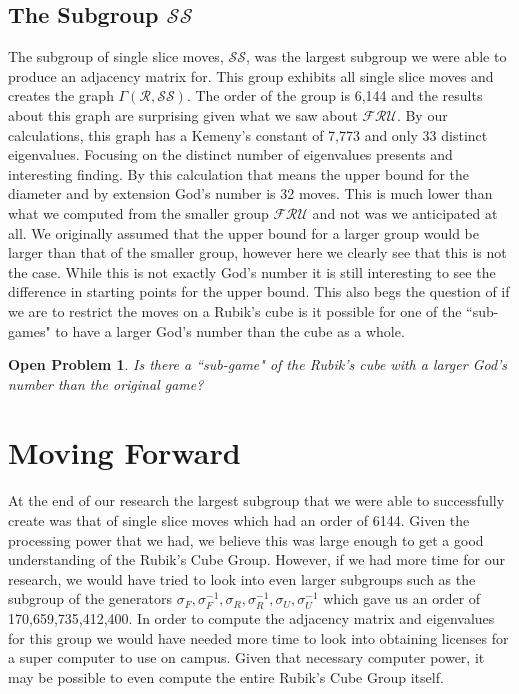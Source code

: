 \documentclass{article}
\newtheorem{open-problem}[theorem]{Open Problem}
\begin{document}
\subsection{The Subgroup $\mathcal{SS}$}
The subgroup of single slice moves, $\mathcal{SS}$, was the largest subgroup we were able to produce an adjacency matrix for.  This group exhibits all single slice moves and creates the graph $\Gamma(\mathcal{R}, \mathcal{SS})$.  The order of the group is 6,144 and the results about this graph are surprising given what we saw about $\mathcal{FRU}$.  By our calculations, this graph has a Kemeny's constant of 7,773 and only 33 distinct eigenvalues.  Focusing on the distinct number of eigenvalues presents and interesting finding.  By this calculation that means the upper bound for the diameter and by extension God's number is 32 moves.  This is much lower than what we computed from the smaller group $\mathcal{FRU}$ and not was we anticipated at all.  We originally assumed that the upper bound for a larger group would be larger than that of the smaller group, however here we clearly see that this is not the case.  While this is not exactly God's number it is still interesting to see the difference in starting points for the upper bound.  This also begs the question of if we are to restrict the moves on a Rubik's cube is it possible for one of the ``sub-games" to have a larger God's number than the cube as a whole. 
\begin{open-problem}
Is there a ``sub-game" of the Rubik's cube with a larger God's number than the original game?
\end{open-problem}


\section{Moving Forward}
At the end of our research the largest subgroup that we were able to successfully create was that of single slice moves which had an order of 6144.  Given the processing power that we had, we believe this was large enough to get a good understanding of the Rubik's Cube Group.  However, if we had more time for our research, we would have tried to look into even larger subgroups such as the subgroup of the generators $\sigma_F, \sigma_F^{-1}, \sigma_R, \sigma_R^{-1}, \sigma_U, \sigma_U^{-1} $ which gave us an order of 170,659,735,412,400.  In order to compute the adjacency matrix and eigenvalues for this group we would have needed more time to look into obtaining licenses for a super computer to use on campus.  Given that necessary computer power, it may be possible to even compute the entire Rubik's Cube Group itself.

\newpage


\end{document}
